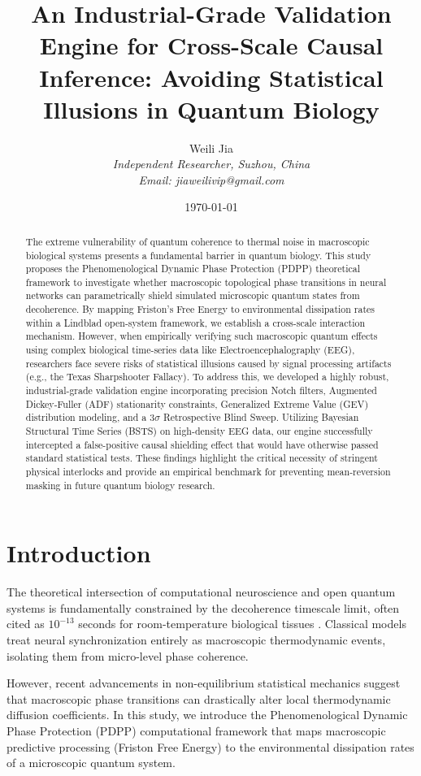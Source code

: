 \documentclass[10pt,twocolumn,letterpaper]{article}
\title{An Industrial-Grade Validation Engine for Cross-Scale Causal Inference: Avoiding Statistical Illusions in Quantum Biology}
\author{Weili Jia \\
\textit{Independent Researcher, Suzhou, China} \\
\textit{Email: jiaweilivip@gmail.com}}
\date{\today}
\begin{document}
\maketitle

\begin{abstract}
The extreme vulnerability of quantum coherence to thermal noise in macroscopic biological systems presents a fundamental barrier in quantum biology. This study proposes the Phenomenological Dynamic Phase Protection (PDPP) theoretical framework to investigate whether macroscopic topological phase transitions in neural networks can parametrically shield simulated microscopic quantum states from decoherence. By mapping Friston's Free Energy to environmental dissipation rates within a Lindblad open-system framework, we establish a cross-scale interaction mechanism. However, when empirically verifying such macroscopic quantum effects using complex biological time-series data like Electroencephalography (EEG), researchers face severe risks of statistical illusions caused by signal processing artifacts (e.g., the Texas Sharpshooter Fallacy). To address this, we developed a highly robust, industrial-grade validation engine incorporating precision Notch filters, Augmented Dickey-Fuller (ADF) stationarity constraints, Generalized Extreme Value (GEV) distribution modeling, and a $3\sigma$ Retrospective Blind Sweep. Utilizing Bayesian Structural Time Series (BSTS) on high-density EEG data, our engine successfully intercepted a false-positive causal shielding effect that would have otherwise passed standard statistical tests. These findings highlight the critical necessity of stringent physical interlocks and provide an empirical benchmark for preventing mean-reversion masking in future quantum biology research.
\end{abstract}

\section{Introduction}
The theoretical intersection of computational neuroscience and open quantum systems is fundamentally constrained by the decoherence timescale limit, often cited as $10^{-13}$ seconds for room-temperature biological tissues \cite{Tegmark2000}. Classical models treat neural synchronization entirely as macroscopic thermodynamic events, isolating them from micro-level phase coherence.

However, recent advancements in non-equilibrium statistical mechanics suggest that macroscopic phase transitions can drastically alter local thermodynamic diffusion coefficients. In this study, we introduce the Phenomenological Dynamic Phase Protection (PDPP) computational framework that maps macroscopic predictive processing (Friston Free Energy) \cite{Friston2010} to the environmental dissipation rates of a microscopic quantum system. 
\end{document}
